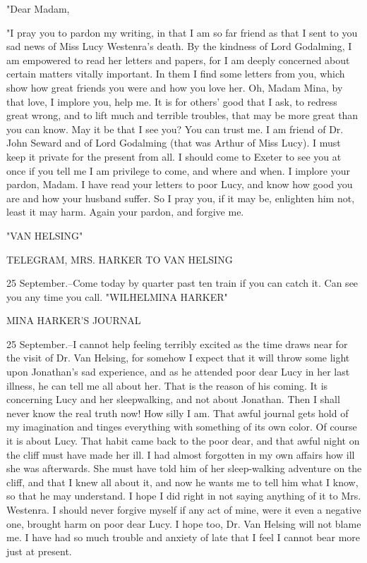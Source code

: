 "Dear Madam, 

"I pray you to pardon my writing, in that I am so far friend as that I sent to you sad news of Miss Lucy Westenra's death. By the kindness of Lord Godalming, I am empowered to read her letters and papers, for I am deeply concerned about certain matters vitally important. In them I find some letters from you, which show how great friends you were and how you love her. Oh, Madam Mina, by that love, I implore you, help me. It is for others' good that I ask, to redress great wrong, and to lift much and terrible troubles, that may be more great than you can know. May it be that I see you? You can trust me. I am friend of Dr. John Seward and of Lord Godalming (that was Arthur of Miss Lucy). I must keep it private for the present from all. I should come to Exeter to see you at once if you tell me I am privilege to come, and where and when. I implore your pardon, Madam. I have read your letters to poor Lucy, and know how good you are and how your husband suffer. So I pray you, if it may be, enlighten him not, least it may harm. Again your pardon, and forgive me. 

"VAN HELSING" 

TELEGRAM, MRS. HARKER TO VAN HELSING 

25 September.--Come today by quarter past ten train if you can catch it. Can see you any time you call. "WILHELMINA HARKER" 

MINA HARKER'S JOURNAL 

25 September.--I cannot help feeling terribly excited as the time draws near for the visit of Dr. Van Helsing, for somehow I expect that it will throw some light upon Jonathan's sad experience, and as he attended poor dear Lucy in her last illness, he can tell me all about her. That is the reason of his coming. It is concerning Lucy and her sleepwalking, and not about Jonathan. Then I shall never know the real truth now! How silly I am. That awful journal gets hold of my imagination and tinges everything with something of its own color. Of course it is about Lucy. That habit came back to the poor dear, and that awful night on the cliff must have made her ill. I had almost forgotten in my own affairs how ill she was afterwards. She must have told him of her sleep-walking adventure on the cliff, and that I knew all about it, and now he wants me to tell him what I know, so that he may understand. I hope I did right in not saying anything of it to Mrs. Westenra. I should never forgive myself if any act of mine, were it even a negative one, brought harm on poor dear Lucy. I hope too, Dr. Van Helsing will not blame me. I have had so much trouble and anxiety of late that I feel I cannot bear more just at present. 

